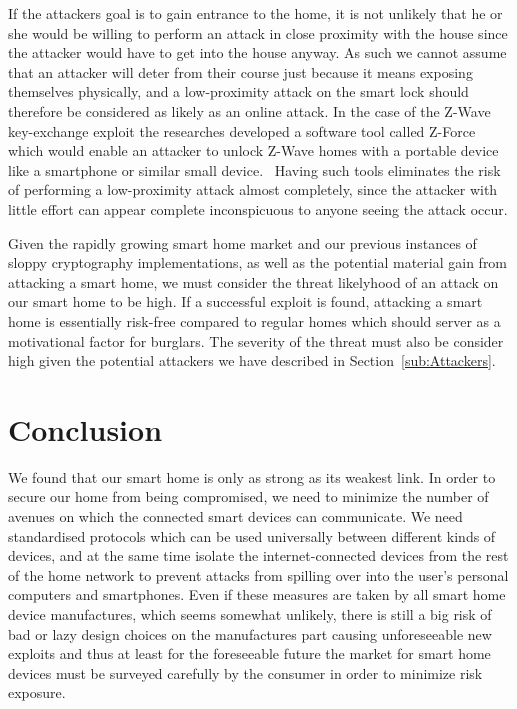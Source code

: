 \documentclass[12pt]{article}
\begin{document}
If the attackers goal is to gain entrance to the home, it is not unlikely that he or she would be willing to perform an attack in close proximity with the house since the attacker would have to get into the house anyway. As such we cannot assume that an attacker will deter from their course just because it means exposing themselves physically, and a low-proximity attack on the smart lock should therefore be considered as likely as an online attack. In the case of the Z-Wave key-exchange exploit the researches developed a software tool called Z-Force which would enable an attacker to unlock Z-Wave homes with a portable device like a smartphone or similar small device.~\cite{z-wave-sensepost} Having such tools eliminates the risk of performing a low-proximity attack almost completely, since the attacker with little effort can appear complete inconspicuous to anyone seeing the attack occur.

Given the rapidly growing smart home market and our previous instances of sloppy cryptography implementations, as well as the potential material gain from attacking a smart home, we must consider the threat likelyhood of an attack on our smart home to be high. If a successful exploit is found, attacking a smart home is essentially risk-free compared to regular homes which should server as a motivational factor for burglars. The severity of the threat must also be consider high given the potential attackers we have described in Section~\ref{sub:Attackers}. 

\newpage

\section{Conclusion}
\label{sec:Conclusion}

We found that our smart home is only as strong as its weakest link. In order to secure our home from being compromised, we need to minimize the number of avenues on which the connected smart devices can communicate. We need standardised protocols which can be used universally between different kinds of devices, and at the same time isolate the internet-connected devices from the rest of the home network to prevent attacks from spilling over into the user's personal computers and smartphones. Even if these measures are taken by all smart home device manufactures, which seems somewhat unlikely, there is still a big risk of bad or lazy design choices on the manufactures part causing unforeseeable new exploits and thus at least for the foreseeable future the market for smart home devices must be surveyed carefully by the consumer in order to minimize risk exposure.

\newpage


\nocite{*}

\end{document}
